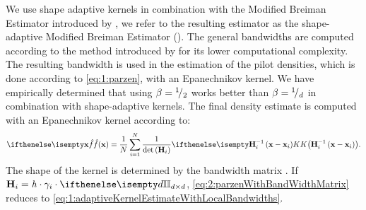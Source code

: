 
	We use shape adaptive kernels in combination with the Modified Breiman Estimator introduced by \textcite{wilkinson1995dataplot}, we refer to the resulting estimator as the shape-adaptive Modified Breiman Estimator (\sambe). 
	The general bandwidths are computed according to the method introduced by \textcite{ferdosi2011comparison} for its lower computational complexity. 
	The resulting bandwidth is used in the estimation of the pilot densities, which is done according to \cref{eq:1:parzen}, with an Epanechnikov kernel.
	We have empirically determined that using $\beta = {}^{1}\!/_{2}$ works better than $\beta = {}^{1}\!/_{d}$ in combination with shape-adaptive kernels.
	The final density estimate is computed with an Epanechnikov kernel according to:
	\begin{equation}\label{eq:2:parzenWithBandWidthMatrix}
		\varEstimatedDensityFunction{\varPattern} = \frac{1}{\varNumPatterns}\sum_{\itXis = 1}^{\varNumPatterns} \frac{1}{\det\left(\varBandwidthMatrix[\itXis]\right)}\varKernel{\varBandwidthMatrix[\itXis]^{-1}\left(\varPattern - \varPattern[\itXis]\right)}.
	\end{equation}
	The shape of the kernel \varKernel{\bullet} is determined by the bandwidth matrix \varBandwidthMatrix[\itXis] \cite{hardle2012nonparametric}. If $\varBandwidthMatrix[\itXis] = \varBandwidth \cdot \varLocalBandwidth{\itXis} \cdot \identityMatrix{\varDim}$, \cref{eq:2:parzenWithBandWidthMatrix} reduces to \cref{eq:1:adaptiveKernelEstimateWithLocalBandwidths}.
	
